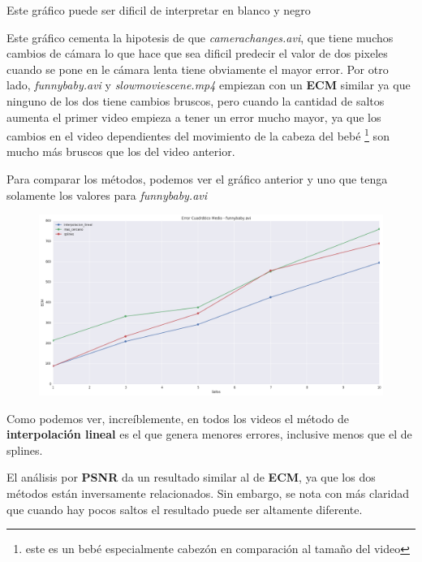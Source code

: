 \vspace{-2em}
\begin{tiny}Este gr\'afico puede ser dificil de interpretar en blanco y negro\end{tiny}
\vspace{2em}

Este gr\'afico cementa la hipotesis de que \textit{camerachanges.avi}, que tiene
muchos cambios de c\'amara lo que hace que sea dificil predecir el valor de dos
pixeles cuando se pone en le c\'amara lenta tiene obviamente el mayor error. Por
otro lado, \textit{funnybaby.avi} y \textit{slowmoviescene.mp4} empiezan con un
\textbf{ECM} similar ya que ninguno de los dos tiene cambios bruscos, pero
cuando la cantidad de saltos aumenta el primer video empieza a tener un error
mucho mayor, ya que los cambios en el video dependientes del movimiento de la
cabeza del beb\'e \footnote{este es un beb\'e especialmente cabez\'on en comparaci\'on al
tama\~no del video} son mucho m\'as bruscos que los del video anterior.

Para comparar los m\'etodos, podemos ver el gr\'afico anterior y uno que tenga
solamente los valores para \textit{funnybaby.avi}

\begin{figure}[H]
\centering
\includegraphics[width=.95\textwidth]{graficos/ecm_funnybaby.png}
\end{figure}

Como podemos ver, incre\'iblemente, en todos los videos el m\'etodo de \textbf{interpolaci\'on
lineal} es el que genera menores errores, inclusive menos que el de splines.

El an\'alisis por \textbf{PSNR} da un resultado similar al de \textbf{ECM}, ya
que los dos m\'etodos est\'an inversamente relacionados. Sin embargo, se nota
con m\'as claridad que cuando hay pocos saltos el resultado puede ser altamente
diferente.

